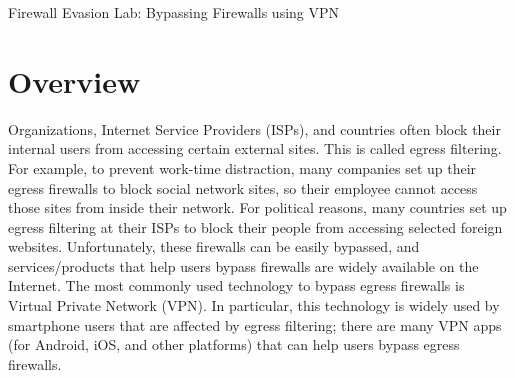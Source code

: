 




\newcommand{\firewallFigs}{./Figs}





\begin{center}
{\LARGE Firewall Evasion Lab: Bypassing Firewalls using VPN}
\end{center}



\setcounter{task}{1}
\newcommand{\tasks} {\bf {\noindent (\arabic{task})} \addtocounter{task}{1} \,}


\section{Overview}


Organizations, Internet Service Providers (ISPs), and countries often block
their internal users from accessing certain external sites. This is called
egress filtering. 
For example, to prevent work-time distraction, many companies set up their egress firewalls
to block social network sites, so their employee cannot access those sites
from inside their network. For political reasons, many countries set up egress filtering at their
ISPs to block their people from accessing
selected foreign websites. Unfortunately, these firewalls can be easily
bypassed, and services/products that help users bypass firewalls are widely
available on the Internet. The most commonly used technology to bypass
egress firewalls is Virtual Private Network (VPN).
In particular, this technology is widely used by smartphone users that are affected by
egress filtering; there are many VPN apps (for Android, iOS, and other
platforms) that can help users bypass egress firewalls. 


